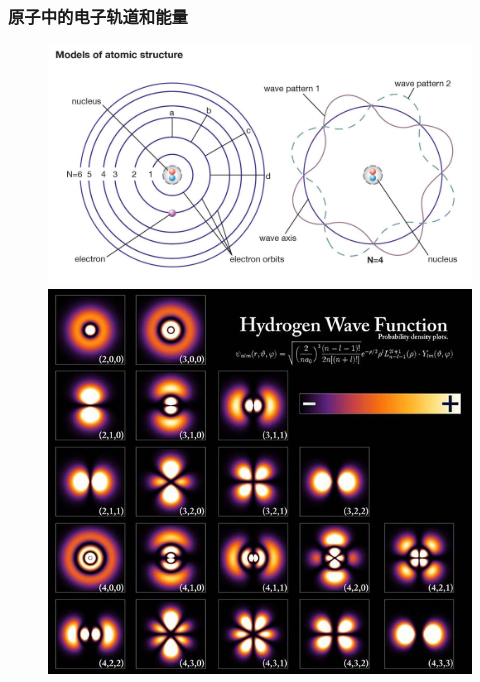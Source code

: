 \frame
{
	\frametitle{原子中的电子轨道和能量}
\begin{minipage}{0.43\textwidth}
\begin{figure}[h!]
	\vspace{-4.8pt}
\centering
\includegraphics[height=0.57\textwidth,width=1.00\textwidth,viewport=0 50 1680 1000,clip]{Figures/electron-theory-Bohr-point-mass-energy-levels.jpg}
\includegraphics[height=0.95\textwidth,width=1.00\textwidth,viewport=0 0 630 650,clip]{Figures/wave_function-2.jpeg}
\label{Atomic-electron_wave}
\end{figure}
\end{minipage}
}
